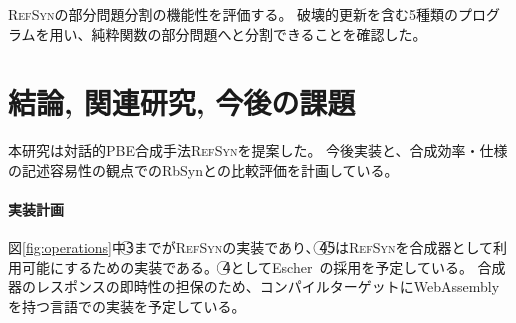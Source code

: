 \documentclass[11pt, a4paper, oneside, twocolumn]{jsarticle}
\newcommand{\mysys}{\textsc{RefSyn}}
\begin{document}

\mysys{}の部分問題分割の機能性を評価する。
破壊的更新を含む5種類のプログラムを用い、純粋関数の部分問題へと分割できることを確認した。



\section{結論, 関連研究, 今後の課題}
本研究は対話的PBE合成手法\mysys{}を提案した。
今後実装と、合成効率・仕様の記述容易性の観点でのRbSynとの比較評価を計画している。

\paragraph*{実装計画}
図\ref{fig:operations}中\textcircled{\scriptsize 3}までが\mysys{}の実装であり、\textcircled{\scriptsize 4}\textcircled{\scriptsize 5}は\mysys{}を合成器として利用可能にするための実装である。
\textcircled{\scriptsize 4}としてEscher~\cite{escher}の採用を予定している。
合成器のレスポンスの即時性の担保のため、コンパイルターゲットにWebAssemblyを持つ言語での実装を予定している。
\end{document}
